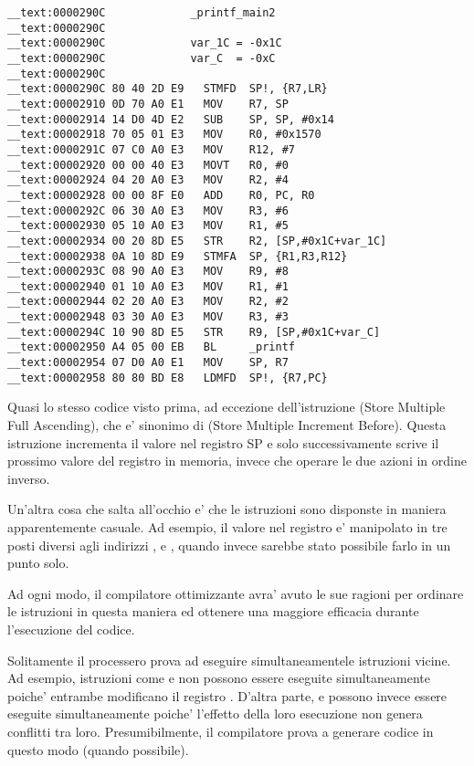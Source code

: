 \myparagraph{\OptimizingXcodeIV: \ARMMode}

\begin{lstlisting}[style=customasmARM]
__text:0000290C             _printf_main2
__text:0000290C
__text:0000290C             var_1C = -0x1C
__text:0000290C             var_C  = -0xC
__text:0000290C
__text:0000290C 80 40 2D E9   STMFD  SP!, {R7,LR}
__text:00002910 0D 70 A0 E1   MOV    R7, SP
__text:00002914 14 D0 4D E2   SUB    SP, SP, #0x14
__text:00002918 70 05 01 E3   MOV    R0, #0x1570
__text:0000291C 07 C0 A0 E3   MOV    R12, #7
__text:00002920 00 00 40 E3   MOVT   R0, #0
__text:00002924 04 20 A0 E3   MOV    R2, #4
__text:00002928 00 00 8F E0   ADD    R0, PC, R0
__text:0000292C 06 30 A0 E3   MOV    R3, #6
__text:00002930 05 10 A0 E3   MOV    R1, #5
__text:00002934 00 20 8D E5   STR    R2, [SP,#0x1C+var_1C]
__text:00002938 0A 10 8D E9   STMFA  SP, {R1,R3,R12}
__text:0000293C 08 90 A0 E3   MOV    R9, #8
__text:00002940 01 10 A0 E3   MOV    R1, #1
__text:00002944 02 20 A0 E3   MOV    R2, #2
__text:00002948 03 30 A0 E3   MOV    R3, #3
__text:0000294C 10 90 8D E5   STR    R9, [SP,#0x1C+var_C]
__text:00002950 A4 05 00 EB   BL     _printf
__text:00002954 07 D0 A0 E1   MOV    SP, R7
__text:00002958 80 80 BD E8   LDMFD  SP!, {R7,PC}
\end{lstlisting}

Quasi lo stesso codice visto prima, ad eccezione dell'istruzione  (Store Multiple Full Ascending),
che e' sinonimo di  (Store Multiple Increment Before). 
Questa istruzione incrementa il valore nel registro \ac{SP} e solo successivamente scrive il prossimo valore del registro in memoria, invece che operare le due azioni in ordine inverso.

Un'altra cosa che salta all'occhio e' che le istruzioni sono disponste in maniera apparentemente casuale.
Ad esempio, il valore nel registro  e' manipolato in tre posti diversi
agli indirizzi ,  e , quando invece sarebbe stato possibile farlo in un punto solo.

Ad ogni modo, il compilatore ottimizzante avra' avuto le sue ragioni per ordinare le istruzioni in questa maniera ed ottenere una maggiore efficacia durante l'esecuzione del codice.

Solitamente il processero prova ad eseguire simultaneamentele istruzioni vicine.
Ad esempio, istruzioni come  e
 non possono essere eseguite simultaneamente poiche' entrambe modificano il registro . 
D'altra parte,  e  
possono invece essere eseguite simultaneamente poiche' l'effetto della loro esecuzione non genera conflitti tra loro.
Presumibilmente, il compilatore prova a generare codice in questo modo (quando possibile).
 
